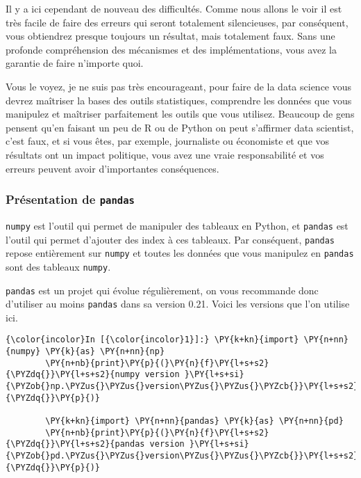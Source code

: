 Il y a ici cependant de nouveau des difficultés. Comme nous allons le
voir il est très facile de faire des erreurs qui seront totalement
silencieuses, par conséquent, vous obtiendrez presque toujours un
résultat, mais totalement faux. Sans une profonde compréhension des
mécanismes et des implémentations, vous avez la garantie de faire
n'importe quoi.

Vous le voyez, je ne suis pas très encourageant, pour faire de la data
science vous devrez maîtriser la bases des outils statistiques,
comprendre les données que vous manipulez et maîtriser parfaitement les
outils que vous utilisez. Beaucoup de gens pensent qu'en faisant un peu
de R ou de Python on peut s'affirmer data scientist, c'est faux, et si
vous êtes, par exemple, journaliste ou économiste et que vos résultats
ont un impact politique, vous avez une vraie responsabilité et vos
erreurs peuvent avoir d'importantes conséquences.

    \hypertarget{pruxe9sentation-de-pandas}{%
\subsubsection{\texorpdfstring{Présentation de
\texttt{pandas}}{Présentation de pandas}}\label{pruxe9sentation-de-pandas}}

    \texttt{numpy} est l'outil qui permet de manipuler des tableaux en
Python, et \texttt{pandas} est l'outil qui permet d'ajouter des index à
ces tableaux. Par conséquent, \texttt{pandas} repose entièrement sur
\texttt{numpy} et toutes les données que vous manipulez en
\texttt{pandas} sont des tableaux \texttt{numpy}.

\texttt{pandas} est un projet qui évolue régulièrement, on vous
recommande donc d'utiliser au moins \texttt{pandas} dans sa version
0.21. Voici les versions que l'on utilise ici.

    \begin{Verbatim}[commandchars=\\\{\},frame=single,framerule=0.3mm,rulecolor=\color{cellframecolor}]
{\color{incolor}In [{\color{incolor}1}]:} \PY{k+kn}{import} \PY{n+nn}{numpy} \PY{k}{as} \PY{n+nn}{np}
        \PY{n+nb}{print}\PY{p}{(}\PY{n}{f}\PY{l+s+s2}{\PYZdq{}}\PY{l+s+s2}{numpy version }\PY{l+s+si}{\PYZob{}np.\PYZus{}\PYZus{}version\PYZus{}\PYZus{}\PYZcb{}}\PY{l+s+s2}{\PYZdq{}}\PY{p}{)}
        
        \PY{k+kn}{import} \PY{n+nn}{pandas} \PY{k}{as} \PY{n+nn}{pd}
        \PY{n+nb}{print}\PY{p}{(}\PY{n}{f}\PY{l+s+s2}{\PYZdq{}}\PY{l+s+s2}{pandas version }\PY{l+s+si}{\PYZob{}pd.\PYZus{}\PYZus{}version\PYZus{}\PYZus{}\PYZcb{}}\PY{l+s+s2}{\PYZdq{}}\PY{p}{)}
\end{Verbatim}


